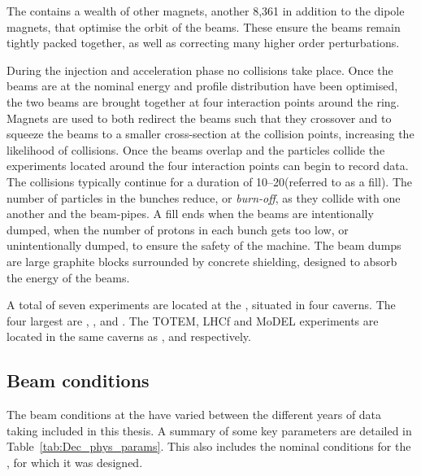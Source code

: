 The \lhc contains a wealth of other magnets, another 8,361 in addition to the dipole magnets, that optimise the orbit of the beams. These ensure the beams remain tightly packed together, as well as correcting many higher order perturbations.   

During the injection and acceleration phase no collisions take place. Once the beams are at the nominal energy and profile distribution have been optimised, the two beams are brought together at four interaction points around the ring. Magnets are used to both redirect the beams such that they crossover and to squeeze the beams to a smaller cross-section at the collision points, increasing the likelihood of collisions. Once the beams overlap and the particles collide the experiments located around the four interaction points can begin to record data. The collisions typically continue for a duration of 10--20\hr (referred to as a fill). The number of particles in the bunches reduce, or \emph{burn-off}, as they collide with one another and the beam-pipes. A fill ends when the beams are intentionally dumped, when the number of protons in each bunch gets too low, or unintentionally dumped, to ensure the safety of the machine. The beam dumps are large graphite blocks surrounded by concrete shielding, designed to absorb the energy of the beams.  

A total of seven experiments are located at the \lhc, situated in four caverns. The four largest are \atlas, \cms, \lhcb and \alice. The TOTEM, LHCf and MoDEL experiments are located in the same caverns as \cms, \atlas and \lhcb respectively. 





\subsection{Beam conditions}
\label{sec:Dec_beam_conds}
The beam conditions at the \lhc have varied between the different years of data taking included in this thesis. A summary of some key parameters are detailed in Table~\ref{tab:Dec_phys_params}. This also includes the nominal conditions for the \lhc, for which it was designed. 


